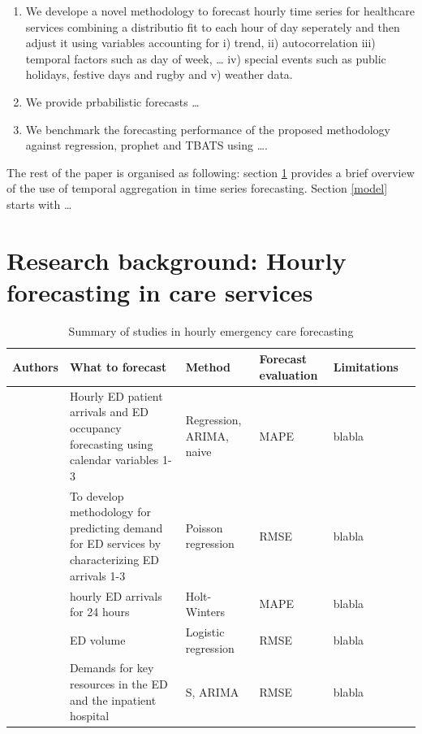\documentclass[]{elsarticle} %
\providecommand{\tightlist}{%
  \setlength{\itemsep}{0pt}\setlength{\parskip}{0pt}}
\begin{document}
\begin{enumerate}
\def\labelenumi{\arabic{enumi}.}
\tightlist
\item
  We develope a novel methodology to forecast hourly time series for healthcare services combining a distributio fit to each hour of day seperately and then adjust it using variables accounting for i) trend, ii) autocorrelation iii) temporal factors such as day of week, \ldots{} iv) special events such as public holidays, festive days and rugby and v) weather data.
\item
  We provide prbabilistic forecasts \ldots{}
\item
  We benchmark the forecasting performance of the proposed methodology against regression, prophet and TBATS using \ldots{}.
\end{enumerate}

The rest of the paper is organised as following: section \ref{lit} provides a brief overview of the use of temporal aggregation in time series forecasting. Section \ref{model} starts with \ldots{}

\hypertarget{lit}{%
\section{Research background: Hourly forecasting in care services}\label{lit}}

\begin{table}[h]
\caption{Summary of studies in hourly emergency care forecasting}
\centering 
\begin{adjustbox}{width=1\textwidth}
\small

\begin{tabular}{clllll} 
\hline
Authors & What to forecast & Method & Forecast evaluation & Limitations  \\ 
\hline 

\citet{hertzum2017forecasting} & Hourly ED patient arrivals and ED occupancy forecasting using calendar variables  1-3 & Regression, ARIMA, naive & MAPE & blabla\\ 
\citet{mccarthy2008challenge} & To develop methodology for predicting demand for ED services by characterizing ED arrivals  1-3 & Poisson regression & RMSE & blabla\\ 
\citet{morzuch2006forecasting} & hourly ED arrivals for 24 hours & Holt-Winters & MAPE & blabla\\ 
\citet{chase2012predicting} & ED volume & Logistic regression & RMSE & blabla\\ 
\citet{jones2009multivariate} & Demands for key resources in the ED and the inpatient hospital  & S, ARIMA & RMSE & blabla\\ 


\hline
\end{tabular}
\end{adjustbox}
\label{tab:lit-summary}
\end{table}
\end{document}
